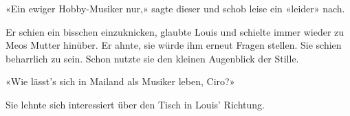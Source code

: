 «Ein ewiger Hobby-Musiker nur,» sagte dieser und schob leise ein 
«leider» nach. 

Er schien ein bisschen einzuknicken, glaubte Louis und 
schielte immer wieder zu Meos Mutter hinüber. Er ahnte, sie würde ihm
erneut Fragen stellen. Sie schien beharrlich zu sein.
Schon nutzte sie den kleinen Augenblick der Stille.

«Wie lässt’s sich in Mailand als Musiker leben, Ciro?»

Sie lehnte sich interessiert über den Tisch in Louis’ Richtung.
